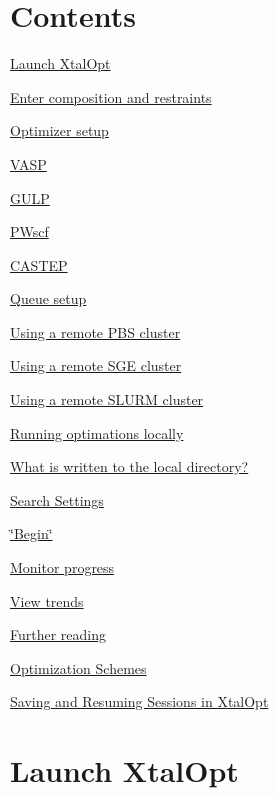 \hypertarget{tut-xo_Contents}{}\section{Contents}\label{tut-xo_Contents}

\begin{DoxyItemize}
\item \hyperlink{tut-xo_launch}{Launch Xtal\-Opt}
\item \hyperlink{tut-xo_init}{Enter composition and restraints}
\item \hyperlink{tut-xo_opt}{Optimizer setup}
\begin{DoxyItemize}
\item \hyperlink{tut-xo_vasp-opt}{V\-A\-S\-P}
\item \hyperlink{tut-xo_gulp-opt}{G\-U\-L\-P}
\item \hyperlink{tut-xo_pwscf-opt}{P\-Wscf}
\item \hyperlink{tut-xo_castep-opt}{C\-A\-S\-T\-E\-P}
\end{DoxyItemize}
\item \hyperlink{tut-xo_qisetup}{Queue setup}
\begin{DoxyItemize}
\item \hyperlink{tut-xo_remotepbs}{Using a remote P\-B\-S cluster}
\item \hyperlink{tut-xo_remotesge}{Using a remote S\-G\-E cluster}
\item \hyperlink{tut-xo_remoteslurm}{Using a remote S\-L\-U\-R\-M cluster}
\item \hyperlink{tut-xo_localqi}{Running optimations locally}
\end{DoxyItemize}
\item \hyperlink{tut-xo_files}{What is written to the local directory?}
\item \hyperlink{tut-xo_search-set}{Search Settings}
\item \hyperlink{tut-xo_begin}{\char`\"{}\-Begin\char`\"{}}
\item \hyperlink{tut-xo_prog-mon}{Monitor progress}
\begin{DoxyItemize}
\item \hyperlink{tut-xo_trends}{View trends}
\end{DoxyItemize}
\item \hyperlink{tut-xo_xo_tut_further}{Further reading}
\begin{DoxyItemize}
\item \hyperlink{optschemes}{Optimization Schemes}
\item \hyperlink{xo_saveresume}{Saving and Resuming Sessions in Xtal\-Opt}
\end{DoxyItemize}
\end{DoxyItemize}\hypertarget{tut-xo_launch}{}\section{Launch Xtal\-Opt}\label{tut-xo_launch}
